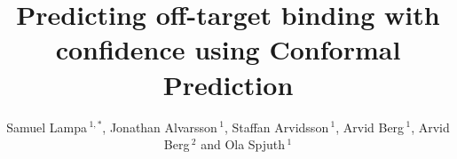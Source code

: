 \documentclass[utf8]{frontiersSCNS} %
\def\firstAuthorLast{Lampa {et~al.}} %
\def\Authors{Samuel Lampa\,$^{1,*}$, Jonathan Alvarsson\,$^{1}$, Staffan Arvidsson\,$^{1}$, Arvid Berg\,$^{1}$, Arvid Berg\,$^{2}$  and Ola Spjuth\,$^{1}$}
\begin{document}
\onecolumn
{}

\title[Predicting off-target binding with confidence using Conformal
Prediction]{Predicting off-target binding with confidence using Conformal
Prediction}

\author[\firstAuthorLast ]{\Authors} %
\address{} %
\correspondance{} %

\extraAuth{}%


\maketitle
\end{document}
